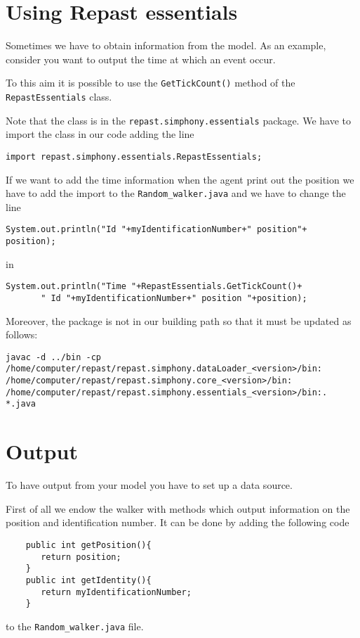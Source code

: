 \documentclass{article}
\begin{document}
\section{Using Repast essentials}

Sometimes we have to obtain information from the model. As an example, consider you want to output the time at which an event occur.

To this aim it is possible to use the \verb+GetTickCount()+ method of the \verb+RepastEssentials+ class.

Note that the class is in the \verb+repast.simphony.essentials+ package. We have to import the class in our code adding the line

\verb+import repast.simphony.essentials.RepastEssentials;+

If we want to add the time information when the agent print out the position we have to add the import to the \verb+Random_walker.java+ and we have to change the line

\begin{verbatim}System.out.println("Id "+myIdentificationNumber+" position"+ position);\end{verbatim}

in

\begin{verbatim}
System.out.println("Time "+RepastEssentials.GetTickCount()+
       " Id "+myIdentificationNumber+" position "+position);
\end{verbatim}





Moreover, the package is not in our building path so that it must be updated as follows:

\begin{verbatim}
javac -d ../bin -cp 
/home/computer/repast/repast.simphony.dataLoader_<version>/bin:
/home/computer/repast/repast.simphony.core_<version>/bin:
/home/computer/repast/repast.simphony.essentials_<version>/bin:. *.java
\end{verbatim}




\section{Output}

To have output from your model you have to set up a data source.

First of all we endow the walker with methods which output information on the position and identification number. It can be done by adding the following code 
\begin{verbatim}
	public int getPosition(){
	   return position;
	}
	public int getIdentity(){
	   return myIdentificationNumber;
	}
\end{verbatim}
to the \verb+Random_walker.java+ file.
\end{document}
